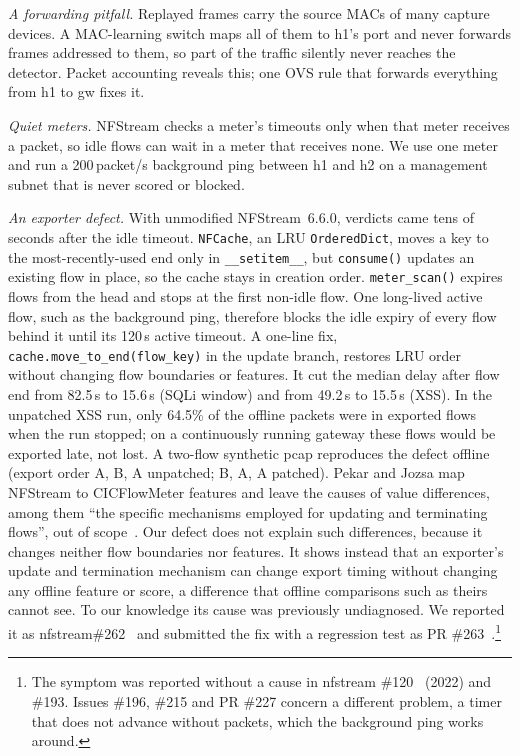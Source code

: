 \emph{A forwarding pitfall.} Replayed frames carry the source MACs of many capture devices. A MAC-learning switch maps all of them to h1's port and never forwards frames addressed to them, so part of the traffic silently never reaches the detector. Packet accounting reveals this; one OVS rule that forwards everything from h1 to gw fixes it.

\emph{Quiet meters.} NFStream checks a meter's timeouts only when that meter receives a packet, so idle flows can wait in a meter that receives none. We use one meter and run a 200\,packet/s background ping between h1 and h2 on a management subnet that is never scored or blocked.

\emph{An exporter defect.} With unmodified NFStream~6.6.0, verdicts came tens of seconds after the idle timeout. \texttt{NFCache}, an LRU \texttt{OrderedDict}, moves a key to the most-recently-used end only in \texttt{\_\_setitem\_\_}, but \texttt{consume()} updates an existing flow in place, so the cache stays in creation order. \texttt{meter\_scan()} expires flows from the head and stops at the first non-idle flow. One long-lived active flow, such as the background ping, therefore blocks the idle expiry of every flow behind it until its 120\,s active timeout. A one-line fix, \texttt{cache.move\_to\_end(flow\_key)} in the update branch, restores LRU order without changing flow boundaries or features. It cut the median delay after flow end from 82.5\,s to 15.6\,s (SQLi window) and from 49.2\,s to 15.5\,s (XSS). In the unpatched XSS run, only 64.5\% of the offline packets were in exported flows when the run stopped; on a continuously running gateway these flows would be exported late, not lost. A two-flow synthetic pcap reproduces the defect offline (export order A, B, A unpatched; B, A, A patched). Pekar and Jozsa map NFStream to CICFlowMeter features and leave the causes of value differences, among them ``the specific mechanisms employed for updating and terminating flows'', out of scope~\cite{pekar2024integrity}. Our defect does not explain such differences, because it changes neither flow boundaries nor features. It shows instead that an exporter's update and termination mechanism can change export timing without changing any offline feature or score, a difference that offline comparisons such as theirs cannot see. To our knowledge its cause was previously undiagnosed. We reported it as nfstream\#262~\cite{nfstream262} and submitted the fix with a regression test as PR \#263~\cite{nfstream263}.\footnote{The symptom was reported without a cause in nfstream \#120~\cite{nfstream120} (2022) and \#193. Issues \#196, \#215 and PR \#227 concern a different problem, a timer that does not advance without packets, which the background ping works around.}
